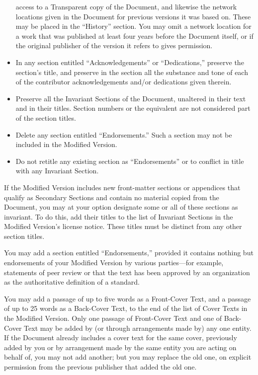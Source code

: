 \begin{itemize}
access to a Transparent copy of the Document, and likewise the network
locations given in the Document for previous versions it was based
on. These may be placed in the ``History'' section. You may omit
a network location for a work that was published at least four years
before the Document itself, or if the original publisher of the version
it refers to gives permission. 
\item In any section entitled ``Acknowledgements'' or ``Dedications,''
preserve the section's title, and preserve in the section all the
substance and tone of each of the contributor acknowledgements and/or
dedications given therein. 
\item Preserve all the Invariant Sections of the Document, unaltered in
their text and in their titles. Section numbers or the equivalent
are not considered part of the section titles. 
\item Delete any section entitled ``Endorsements.'' Such a section may
not be included in the Modified Version. 
\item Do not retitle any existing section as ``Endorsements'' or to conflict
in title with any Invariant Section.
\end{itemize}
If the Modified Version includes new front-matter sections or appendices
that qualify as Secondary Sections and contain no material copied
from the Document, you may at your option designate some or all of
these sections as invariant. To do this, add their titles to the list
of Invariant Sections in the Modified Version's license notice. These
titles must be distinct from any other section titles.

You may add a section entitled ``Endorsements,'' provided it contains
nothing but endorsements of your Modified Version by various parties—for
example, statements of peer review or that the text has been approved
by an organization as the authoritative definition of a standard.

You may add a passage of up to five words as a Front-Cover Text, and
a passage of up to 25 words as a Back-Cover Text, to the end of the
list of Cover Texts in the Modified Version. Only one passage of Front-Cover
Text and one of Back-Cover Text may be added by (or through arrangements
made by) any one entity. If the Document already includes a cover
text for the same cover, previously added by you or by arrangement
made by the same entity you are acting on behalf of, you may not add
another; but you may replace the old one, on explicit permission from
the previous publisher that added the old one.

